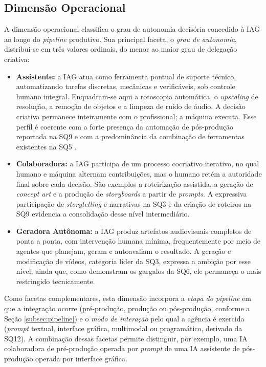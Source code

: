 \subsection{Dimensão Operacional}

A dimensão operacional classifica o grau de autonomia decisória concedido à IAG ao longo do \textit{pipeline} produtivo. Sua principal faceta, o \textit{grau de autonomia}, distribui-se em três valores ordinais, do menor ao maior grau de delegação criativa:

\begin{itemize}
    \item \textbf{Assistente:} a IAG atua como ferramenta pontual de suporte técnico, automatizando tarefas discretas, mecânicas e verificáveis, sob controle humano integral. Enquadram-se aqui a rotoscopia automática, o \textit{upscaling} de resolução, a remoção de objetos e a limpeza de ruído de áudio. A decisão criativa permanece inteiramente com o profissional; a máquina executa. Esse perfil é coerente com a forte presença da automação de pós-produção reportada na SQ9 e com a predominância da combinação de ferramentas existentes na SQ5 \citep{RothAleo2026}.
    \item \textbf{Colaboradora:} a IAG participa de um processo cocriativo iterativo, no qual humano e máquina alternam contribuições, mas o humano retém a autoridade final sobre cada decisão. São exemplos a roteirização assistida, a geração de \textit{concept art} e a produção de \textit{storyboards} a partir de \textit{prompts}. A expressiva participação de \textit{storytelling} e narrativas na SQ3 e da criação de roteiros na SQ9 evidencia a consolidação desse nível intermediário.
    \item \textbf{Geradora Autônoma:} a IAG produz artefatos audiovisuais completos de ponta a ponta, com intervenção humana mínima, frequentemente por meio de agentes que planejam, geram e autoavaliam o resultado. A geração e modificação de vídeos, categoria líder da SQ3, expressa a ambição por esse nível, ainda que, como demonstram os gargalos da SQ6, ele permaneça o mais restringido tecnicamente.
\end{itemize}

Como facetas complementares, esta dimensão incorpora a \textit{etapa do pipeline} em que a integração ocorre (pré-produção, produção ou pós-produção, conforme a Seção \ref{subsec:pipeline}) e o \textit{modo de interação} pelo qual a agência é exercida (\textit{prompt} textual, interface gráfica, multimodal ou programático, derivado da SQ12). A combinação dessas facetas permite distinguir, por exemplo, uma IA colaboradora de pré-produção operada por \textit{prompt} de uma IA assistente de pós-produção operada por interface gráfica.

